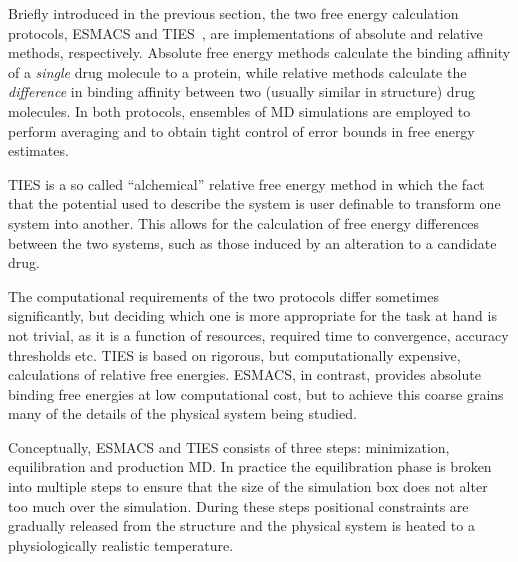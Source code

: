  
Briefly introduced in the previous section, the two free energy calculation 
protocols, ESMACS and TIES~\cite{Wan2017brd4, Bhati2017}, are 
implementations of absolute and relative methods, respectively. 
Absolute free energy methods calculate the binding affinity of a \emph{single} 
drug molecule to a protein, while relative methods calculate the 
\emph{difference} in binding affinity between two (usually similar in structure) 
drug molecules. In both protocols, ensembles of MD simulations are employed to 
perform averaging and to obtain tight control of error bounds in free energy 
estimates.



TIES is a so called ``alchemical'' relative free energy method 
in which the fact that the potential used to describe the system is user 
definable to transform one system into another. This allows for the calculation 
of free energy differences between the two systems, such as those induced by an 
alteration to a candidate drug. 

The computational requirements of the two protocols differ sometimes 
significantly, but deciding which one is more appropriate for the task at hand 
is not trivial, as it is a function of resources, required time to convergence, 
accuracy thresholds etc. TIES is based on rigorous, but computationally 
expensive, calculations of relative free energies. 
ESMACS, in contrast, provides absolute binding 
free energies at low computational cost, but to achieve this coarse grains many 
of the details of the physical system being studied. 

Conceptually, ESMACS and TIES consists of three steps: minimization, 
equilibration and production MD. 
In practice the equilibration phase is broken 
into multiple steps to ensure that the size of the simulation box does not alter 
too much over the simulation. 
During these steps positional constraints are 
gradually released from the structure and the physical system is heated to a 
physiologically realistic temperature. 

